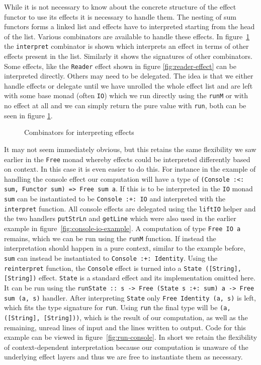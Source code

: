 While it is not necessary to know about the concrete structure of the effect
functor to use its effects it is necessary to handle them. The nesting of sum
functors forms a linked list and effects have to interpreted starting from the
head of the list. Various combinators are available to handle these effects. In
figure~\ref{fig:interpreting} the \texttt{interpret} combinator is shown which
interprets an effect in terms of other effects present in the list. Similarly it
shows the signatures of other combinators. Some effects, like the
\texttt{Reader} effect shown in figure \ref{fig:reader-effect} can be
interpreted directly. Others may need to be delegated. The idea is that we
either handle effects or delegate until we have unrolled the whole effect list
and are left with some base monad (often \texttt{IO}) which we run directly
using the \texttt{runM} or with no effect at all and we can simply return the
pure value with \texttt{run}, both can be seen in figure \ref{fig:interpreting}.

\begin{figure}
  
  \caption{Combinators for interpreting effects}
  \label{fig:interpreting}
\end{figure}

It may not seem immediately obvious, but this retains the same flexibility we
saw earlier in the \texttt{Free} monad whereby effects could be interpreted
differently based on context. In this case it is even easier to do this. For
instance in the example of handling the console effect our computation will have
a type of \texttt{(Console :<: sum, Functor sum) => Free sum a}. If this is to
be interpreted in the \texttt{IO} monad \texttt{sum} can be instantiated to be
\texttt{Console :+: IO} and interpreted with the \texttt{interpret} function.
All console effects are delegated using the \texttt{liftIO} helper and the two
handlers \texttt{putStrLn} and \texttt{getLine} which were also used in the
earlier example in figure~\ref{fig:console-io-example}. A computation of type
\texttt{Free IO a} remains, which we can be run using the \texttt{runM}
function. If instead the interpretation should happen in a pure context, similar
to the example before, \texttt{sum} can instead be instantiated to
\texttt{Console :+: Identity}. Using the \texttt{reinterpret} function, the
\texttt{Console} effect is turned into a \texttt{State ([String], [String])}
effect. \texttt{State} is a standard effect and its implementation omitted here.
It can be run using the \texttt{runState :: s -> Free (State s :+: sum) a ->
  Free sum (a, s)} handler. After interpreting \texttt{State} only \texttt{Free
  Identity (a, s)} is left, which fits the type signature for \texttt{run}.
Using \texttt{run} the final type will be \texttt{(a, ([String], [String]))},
which is the result of our computation, as well as the remaining, unread lines
of input and the lines written to output. Code for this example can be viewed in
figure~\ref{fig:run-console}. In short we retain the flexibility of
context-dependent interpretation because our computation is unaware of the
underlying effect layers and thus we are free to instantiate them as necessary.

